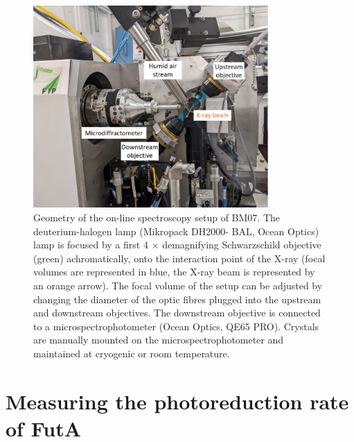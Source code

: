 \begin{figure}[H] %
\begin{center}
\noindent \includegraphics[width=0.8\textwidth]{images/Spectroscopy/geometry.pdf}
\end{center}
\caption{Geometry of the on-line spectroscopy setup of BM07. The deuterium-halogen lamp (Mikropack DH2000- BAL, Ocean Optics) lamp is focused by a first 4 \(\times\) demagnifying Schwarzschild objective (green) achromatically, onto the interaction point of the X-ray (focal volumes are represented in blue, the X-ray beam is represented by an orange arrow). The focal volume of the setup can be adjusted by changing the diameter of the optic fibres plugged into the upstream and downstream objectives. The downstream objective is connected to a microspectrophotometer (Ocean Optics, QE65 PRO). Crystals are manually mounted on the microspectrophotometer and maintained at cryogenic or room temperature.}
\label{fig:online_microspec_BM07}
\end{figure}

\section{Measuring the photoreduction rate of FutA}


